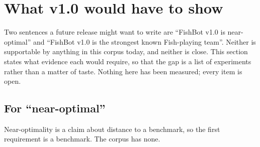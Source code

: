 \section{What v1.0 would have to show}
\label{sec:towardone}

Two sentences a future release might want to write are ``FishBot v1.0 is near-optimal'' and ``FishBot
v1.0 is the strongest known Fish-playing team''. Neither is supportable by anything in this corpus
today, and neither is close. This section states what evidence each would require, so that the gap is
a list of experiments rather than a matter of taste. Nothing here has been measured; every item is
open.

\subsection{For ``near-optimal''}
\label{sec:towardone-optimal}

Near-optimality is a claim about distance to a benchmark, so the first requirement is a benchmark.
The corpus has none.

